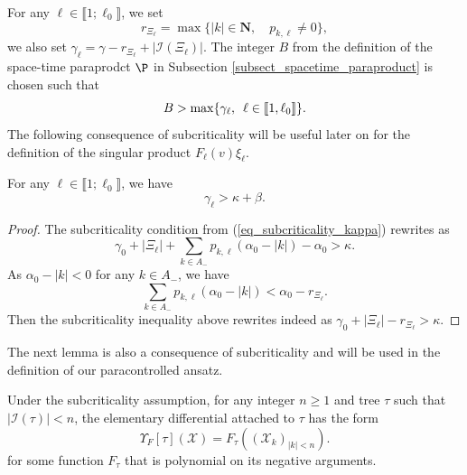 \documentclass[11pt]{preprint}
\newcommand{\mcI}{\mathcal{I}}
\newcommand{\mcX}{\mathcal{X}}
\def\eqref#1{(\ref{#1})}
\newcommand{\bfN}{\mathbf{N}}
\newcommand{\bbrack}[1]{ \llbracket #1 \rrbracket }
\begin{document}
For any $\ell\in \bbrack{1;\ell_0}$, we set 
$${r}_{\Xi_\ell} = \max\{ |k|\in\bfN, \quad p_{k,\ell}\ne 0   \}, $$
we also set 
$
\gamma_\ell = \gamma-{r}_{\Xi_\ell}+ |\mcI(\Xi_\ell)|.
$
The integer $B$ from the definition of the space-time paraprodct $\P$ in Subsection \ref{subsect_spacetime_paraproduct} is chosen such that 
$$
B >  \max\{ \gamma_\ell, \enskip \ell\in\bbrack{1,\ell_0}   \}.
$$
The following consequence of subcriticality will be useful later on for the  definition of the singular product $F_\ell(v)\xi_\ell$.

\begin{lemma}\label{lem_ineqgammal}
For any $\ell\in\bbrack{1;\ell_0}$, we have 
$$
\gamma_\ell >\kappa + \beta .
$$
\end{lemma}

\begin{proof}
	The subcriticality condition from \eqref{eq_subcriticality_kappa} rewrites as 
	$$
	\gamma_0 + |\Xi_\ell| + \sum_{k\in A_-} p_{k,\ell}(\alpha_0-|k|)- \alpha_0>\kappa.
	$$
	As $\alpha_0-|k|<0$ for any $k\in A_-$, we have 
	$$\sum_{k\in A_-} p_{k,\ell}(\alpha_0-|k|)<\alpha_0-r_{\Xi_\ell}.$$
Then the subcriticality inequality above rewrites indeed as $\gamma_0 + |\Xi_\ell|  -r_{\Xi_\ell}>\kappa.$
\end{proof}




The next lemma is also a consequence of subcriticality and will be used in the definition of our paracontrolled ansatz.

\begin{lemma}\label{lem_elementary differential_form}
	Under the subcriticality assumption, for any integer $n\geq 1$ and tree $\tau$ such that $|\mcI(\tau)|<n$, the elementary differential attached to $\tau$ has the form
	$$
	\Upsilon_F[\tau](\mcX)  = F_\tau\left((\mcX_k)_{|k|<n}\right).
	$$
	for some function $F_\tau$ that is polynomial on its negative arguments.
\end{lemma}
\end{document}
